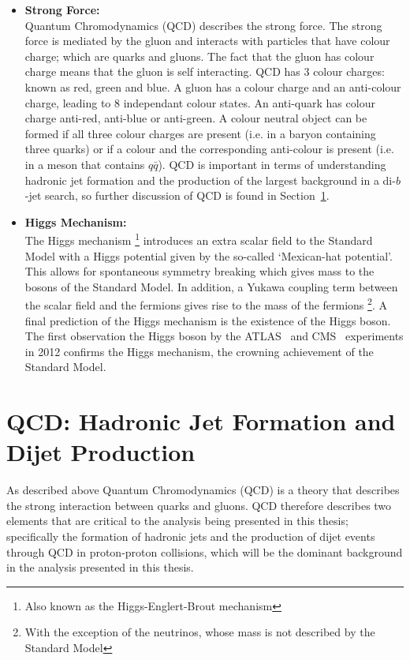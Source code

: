 \begin{itemize}[leftmargin=*]
\item\textbf{Strong Force:}\\
  Quantum Chromodynamics (QCD) describes the strong force.
  The strong force is mediated by the gluon 
  and interacts with particles that have colour charge; which are quarks and gluons.
  The fact that the gluon has colour charge means that the gluon is self interacting.
  QCD has 3 colour charges: known as red, green and blue.
  A gluon has a colour charge and an anti-colour charge, leading to 8 independant colour states.
  An anti-quark has colour charge anti-red, anti-blue or anti-green.
  A colour neutral object can be formed if all three colour charges are present (i.e. in a baryon containing three quarks)
  or if a colour and the corresponding anti-colour is present (i.e. in a meson that contains $q\bar{q}$).
  QCD is important in terms of understanding hadronic jet formation and the production of the
  largest background in a di-$b$-jet search, so further discussion of QCD is found in Section~\ref{sec:theo-qcd}.\vspace{1em}

\item\textbf{Higgs Mechanism:}\\
  The Higgs mechanism \footnote{Also known as the Higgs-Englert-Brout mechanism}
  introduces an extra scalar field to the Standard Model
  with a Higgs potential given by the so-called `Mexican-hat potential'.
  This allows for spontaneous symmetry breaking which gives mass to the bosons of the Standard Model.
  In addition, a Yukawa coupling term between the scalar field and the fermions gives rise to the mass of the fermions
  \footnote{With the exception of the neutrinos, whose mass is not described by the Standard Model}.
  A final prediction of the Higgs mechanism is the existence of the Higgs boson.
  The first observation the Higgs boson by the ATLAS~\cite{theo-higgs_atlas} and CMS~\cite{theo-higgs_cms} experiments
  in 2012 confirms the Higgs mechanism, the crowning achievement of the Standard Model.
\end{itemize}

\section{QCD: Hadronic Jet Formation and Dijet Production}
\label{sec:theo-qcd}

As described above Quantum Chromodynamics (QCD) is a theory that describes the strong interaction between
quarks and gluons.
QCD therefore describes two elements that are critical to the analysis being presented in this thesis;
specifically the formation of hadronic jets and the production of dijet events through QCD in proton-proton collisions,
which will be the dominant background in the analysis presented in this thesis.

